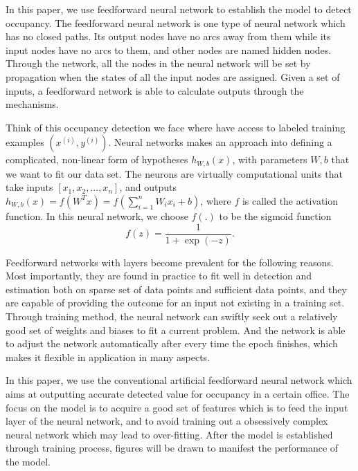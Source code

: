 In this paper, we use feedforward neural network to establish the model to detect occupancy. The feedforward neural network is one type of neural network which has no closed paths. Its output nodes have no arcs away from them while its input nodes have no arcs to them, and other nodes are named hidden nodes. Through the network, all the nodes in the neural network will be set by propagation when the states of all the input nodes are assigned. Given a set of inputs, a feedforward network is able to calculate outputs through the mechanisms.

Think of this occupancy detection we face where have access to labeled training examples $\left( {{x^{\left( i \right)}},{y^{\left( i \right)}}} \right)$. Neural networks makes an approach into defining a complicated, non-linear form of hypotheses ${h_{W,b}}\left( x \right)$, with parameters $W,b$ that we want to fit our data set. The neurons are virtually computational units that take inputs $[{x_1},{x_2},...,{x_n}]$, and outputs ${h_{W,b}}\left( x \right) = f\left( {{W^T}x} \right) = f\left( {\sum\nolimits_{i = 1}^n {{W_i}{x_i} + b} } \right)$, where $f$ is called the activation function. In this neural network, we choose $f\left( . \right)$ to be the sigmoid function
\[f\left( z \right) = \frac{1}{{1 + \exp \left( { - z} \right)}}.\]

Feedforward networks with layers become prevalent for the following reasons. Most importantly, they are found in practice to fit well in detection and estimation both on sparse set of data points and sufficient data points, and they are capable of providing the outcome for an input not existing in a training set. Through training method, the neural network can swiftly seek out a relatively good set of weights and biases to fit a current problem. And the network is able to adjust the network automatically after every time the epoch finishes, which makes it flexible in application in many aspects.

In this paper, we use the conventional artificial feedforward neural network which aims at outputting accurate detected value for occupancy in a certain office. The focus on the model is to acquire a good set of features which is to feed the input layer of the neural network, and to avoid training out a obsessively complex neural network which may lead to over-fitting. After the model is established through training process, figures will be drawn to manifest the performance of the model.
